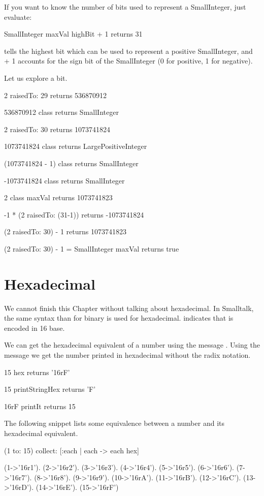 \documentclass[a4paper,10pt,twoside]{book}
\begin{document}
If you want to know the number of bits used to represent a
SmallInteger, just evaluate:

\begin{code}{}
SmallInteger maxVal highBit + 1
	returns 31
\end{code}

 tells the highest bit which can be used to
represent a positive SmallInteger, and + 1 accounts for the sign bit
of the SmallInteger (0 for positive, 1 for negative).


Let us explore a bit. 

\begin{code}{}
2 raisedTo: 29 
	returns 536870912 

536870912 class
	returns SmallInteger

2 raisedTo: 30 
	returns 1073741824

1073741824 class
	returns LargePositiveInteger
	
(1073741824 - 1) class
	returns SmallInteger

-1073741824 class 
	returns SmallInteger

2 class maxVal 
	returns 1073741823

-1 * (2 raisedTo: (31-1)) 
	returns -1073741824
	
(2 raisedTo: 30) - 1
	returns 1073741823
	
(2 raisedTo: 30) - 1 = SmallInteger maxVal	
	returns true
\end{code}

\section{Hexadecimal}
We cannot finish this Chapter without talking about hexadecimal. In Smalltalk, the same syntax than for binary is used for hexadecimal.  indicates that  is encoded in 16 base. 

We can get the hexadecimal equivalent of a number using the message . 
Using the message  we get the number printed in hexadecimal without the radix notation. 

\begin{code}
15 hex
	returns '16rF'
	
15 printStringHex 
	returns 'F'

16rF printIt
	returns 15
\end{code}

The following snippet lists some equivalence between a number and its hexadecimal equivalent.
\begin{code}
(1 to: 15) collect: [:each | each -> each hex] 

{(1->'16r1'). (2->'16r2'). (3->'16r3'). (4->'16r4'). (5->'16r5'). (6->'16r6'). (7->'16r7'). (8->'16r8'). (9->'16r9'). (10->'16rA'). (11->'16rB'). (12->'16rC'). (13->'16rD'). (14->'16rE'). (15->'16rF')}
\end{code}
\end{document}
